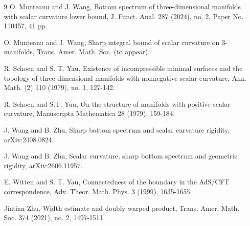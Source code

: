 \documentclass{amsart}
\numberwithin{equation}{section}
\begin{document}
\begin{thebibliography}{9}
 O. Munteanu and J. Wang, Bottom spectrum of three-dimensional
manifolds with scalar curvature lower bound, J. Funct. Anal. 287 (2024),
no. 2, Paper No. 110457, 41 pp.

 O. Munteanu and J. Wang, Sharp integral bound of scalar
curvature on $3$-manifolds, Trans. Amer. Math. Soc. (to appear).

 R. Schoen and S. T. Yau, Existence of incompressible minimal surfaces and
the topology of three-dimensional manifolds with nonnegative scalar curvature, 
Ann. Math. (2) 110 (1979), no. 1, 127-142. 

 R. Schoen and S.T. Yau, On the structure of manifolds with
positive scalar curvature, Manuscripta Mathematica 28 (1979), 159-184.

 J. Wang and B. Zhu, Sharp bottom spectrum and scalar curvature rigidity, arXiv:2408.0824.

 J. Wang and B. Zhu, Scalar curvature, sharp bottom spectrum and geometric rigidity, 	arXiv:2606.11957.

 E. Witten and S. T. Yau, Connectedness
of the boundary in the AdS/CFT correspondence, 
Adv. Theor. Math. Phys. 3 (1999), 1635-1655.

 Jintian Zhu, Width estimate and doubly warped product, 
Trans. Amer. Math. Soc. 374 (2021), no. 2, 1497-1511. 

\end{thebibliography}
\end{document}
